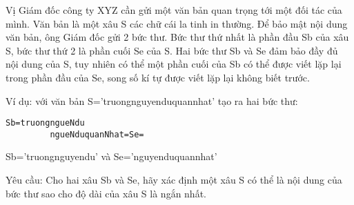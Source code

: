 Vị Giám đốc công ty XYZ cần gửi một văn bản quan trọng tới một đối tác của mình. Văn bản là một xâu S các chữ cái la tinh in thường. Để bảo mật nội dung văn bản, ông Giám đốc gửi 2 bức thư. Bức thư thứ nhất là phần đầu Sb của xâu S, bức thư thứ 2 là phần cuối Se của S.  Hai bức thư Sb và Se đảm bảo đầy đủ nội dung của S, tuy nhiên có thể một phần cuối của Sb có thể được viết lặp lại trong phần đầu của Se, song số kí tự được viết lặp lại không biết trước.  

   Ví dụ: với văn bản S=’truongnguyenduquannhat’ tạo ra hai bức thư:  
\begin{verbatim}
Sb=truongngueNdu
         ngueNduquanNhat=Se=
\end{verbatim}

   Sb=’truongnguyendu’ và Se=’nguyenduquannhat’  

   Yêu cầu: Cho hai xâu Sb và Se, hãy xác định một xâu S có thể là nội dung của bức thư sao cho độ dài của xâu S là ngắn nhất.  

\